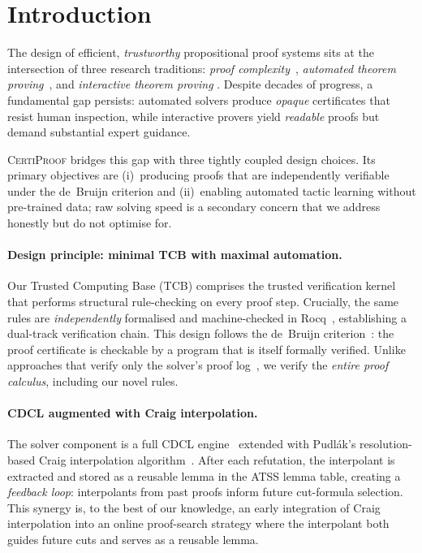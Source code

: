 \documentclass[acmtocl,review,anonymous]{acmart}
\newcommand{\CP}{\textsc{CertiProof}}
\newcommand{\TCB}{\textnormal{TCB}}
\begin{document}
\maketitle

\section{Introduction}
\label{sec:intro}

The design of efficient, \emph{trustworthy} propositional proof systems
sits at the intersection of three research traditions:
\emph{proof complexity}~\cite{CookReckhow1979,Ben-Sasson2001},
\emph{automated theorem proving}~\cite{Davis1962,Robinson1965}, and
\emph{interactive theorem proving}
\cite{CoqDevelopmentTeam2024,MouraKong2021}.
Despite decades of progress, a fundamental gap persists: automated
solvers produce \emph{opaque} certificates that resist human inspection,
while interactive provers yield \emph{readable} proofs but demand
substantial expert guidance.

\CP{} bridges this gap with three tightly coupled design choices.
Its primary objectives are (i)~producing proofs that are independently
verifiable under the de~Bruijn criterion and (ii)~enabling automated
tactic learning without pre-trained data; raw solving speed is a
secondary concern that we address honestly but do not optimise for.

\paragraph{Design principle: minimal \TCB{} with maximal automation.}
Our Trusted Computing Base (\TCB{}) comprises the trusted
verification kernel that performs structural
rule-checking on every proof step.  Crucially, the same rules are
\emph{independently} formalised and machine-checked in
Rocq~\cite{CoqDevelopmentTeam2024}, establishing a
dual-track verification chain.  This design follows the de~Bruijn
criterion~\cite{Harrison2009}: the proof certificate is checkable by
a program that is itself formally verified.  Unlike approaches that
verify only the solver's proof log~\cite{HeuleHuntMahmoud2017}, we
verify the \emph{entire proof calculus}, including our novel rules.

\paragraph{CDCL augmented with Craig interpolation.}
The solver component is a full CDCL
engine~\cite{Marques-Silva1999,EenSorensson2003} extended with
Pudl\'{a}k's resolution-based Craig interpolation
algorithm~\cite{Krajicek1995}.  After each refutation, the interpolant
is extracted and stored as a reusable lemma in the ATSS lemma table,
creating a \emph{feedback loop}: interpolants from past proofs inform
future cut-formula selection.  This synergy is, to the best of our knowledge, an early
integration of Craig interpolation into an online
proof-search strategy where the interpolant both guides future
cuts and serves as a reusable lemma.
\end{document}
